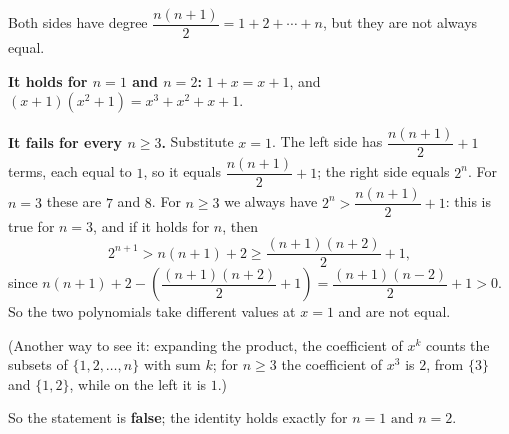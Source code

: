 Both sides have degree $\dfrac{n(n+1)}{2}=1+2+\cdots+n$, but they are not always equal.

\textbf{It holds for $n=1$ and $n=2$:} $1+x=x+1$, and $(x+1)(x^2+1)=x^3+x^2+x+1$.

\textbf{It fails for every $n\ge3$.} Substitute $x=1$. The left side has $\dfrac{n(n+1)}{2}+1$ terms, each equal to $1$, so it equals $\dfrac{n(n+1)}{2}+1$; the right side equals $2^n$. For $n=3$ these are $7$ and $8$. For $n\ge3$ we always have $2^n>\dfrac{n(n+1)}{2}+1$: this is true for $n=3$, and if it holds for $n$, then
\[2^{n+1}>n(n+1)+2\ge\dfrac{(n+1)(n+2)}{2}+1,\]
since $n(n+1)+2-\left(\dfrac{(n+1)(n+2)}{2}+1\right)=\dfrac{(n+1)(n-2)}{2}+1>0$. So the two polynomials take different values at $x=1$ and are not equal.

(Another way to see it: expanding the product, the coefficient of $x^k$ counts the subsets of $\{1,2,\dots,n\}$ with sum $k$; for $n\ge3$ the coefficient of $x^3$ is $2$, from $\{3\}$ and $\{1,2\}$, while on the left it is $1$.)

So the statement is \textbf{false}; the identity holds exactly for $\boxed{n=1\text{ and }n=2}$.
